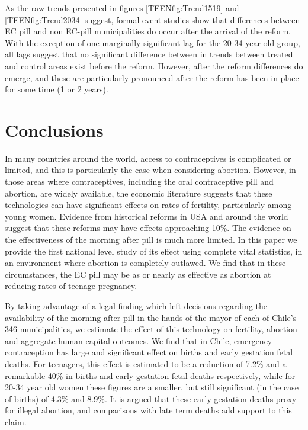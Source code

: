 As the raw trends presented in figures \ref{TEENfig:Trend1519} and 
\ref{TEENfig:Trend2034} suggest, formal event studies show that differences 
between EC pill and non EC-pill municipalities do occur after the arrival of the
reform.  With the exception of one marginally significant lag for the 20-34 year
old group, all lags suggest that no significant difference between in trends
between treated and control areas exist before the reform.  However, after the
reform differences do emerge, and these are particularly pronounced after the
reform has been in place for some time (1 or 2 years).

\section{Conclusions}
\label{TEENscn:conclusion}
In many countries around the world, access to contraceptives is complicated or
limited, and this is particularly the case when considering abortion.  However,
in those areas where contraceptives, including the oral contraceptive pill and 
abortion, are widely available, the economic literature suggests that these
technologies can have significant effects on rates of fertility, particularly
among young women.  Evidence from historical reforms in USA and around the world
suggest that these reforms may have effects approaching 10\%.  The evidence on
the effectiveness of the morning after pill is much more limited.  In this paper
we provide the first national level study of its effect using complete vital
statistics, in an environment where abortion is completely outlawed. We find that
in these circumstances, the EC pill may be as or nearly as effective as abortion
at reducing rates of teenage pregnancy.

By taking advantage of a legal finding which left decisions regarding the 
availability of the morning after pill in the hands of the mayor of each of
Chile's 346 municipalities, we estimate the effect of this technology on 
fertility, abortion and aggregate human capital outcomes. We find that in Chile,
emergency contraception has large and significant effect on births and early 
gestation fetal deaths.  For teenagers, this effect is estimated to be a
reduction of 7.2\% and a remarkable 40\% in births and early-gestation fetal 
deaths respectively, while for 20-34 year old women these figures are a smaller, 
but still significant (in the case of births) of 4.3\% and 8.9\%.  It is argued 
that these early-gestation deaths proxy for illegal abortion, and comparisons 
with late term deaths add support to this claim.


